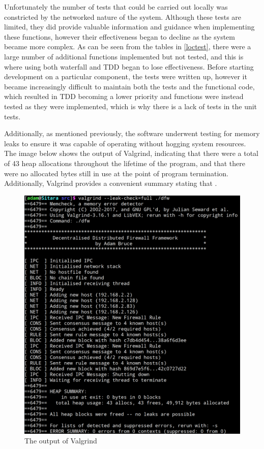 \documentclass[a4paper, 11pt]{report}
\begin{document}
Unfortunately the number of tests that could be carried out locally was constricted by the networked nature of the system. Although these tests are limited, they did provide valuable information and guidance when implementing these functions, however their effectiveness began to decline as the system became more complex. As can be seen from the tables in \ref{loctest}, there were a large number of additional functions implemented but not tested, and this is where using both waterfall and TDD began to lose effectiveness. Before starting development on a particular component, the tests were written up, however it became increasingly difficult to maintain both the tests and the functional code, which resulted in TDD becoming a lower priority and functions were instead tested as they were implemented, which is why there is a lack of tests in the unit tests.

Additionally, as mentioned previously, the software underwent testing for memory leaks to ensure it was capable of operating without hogging system resources. The image below shows the output of Valgrind, indicating that there were a total of 43 heap allocations throughout the lifetime of the program, and that there were no allocated bytes still in use at the point of program termination. Additionally, Valgrind provides a convenient summary stating that .

\begin{figure}[H]
\centering
\includegraphics[width=\textwidth,keepaspectratio]{valgrind}
\caption{The output of Valgrind} 
\label{fig:valgrind}
\end{figure}
\end{document}
